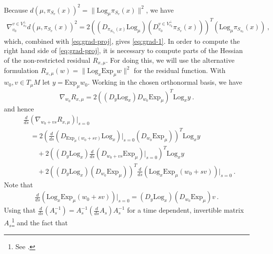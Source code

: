 \documentclass[final]{svjour3}
\newcommand{\df}[2]{\tfrac{d}{d#2} #1}
\newcommand{\Exp}{\mathrm{Exp}}
\newcommand{\Log}{\mathrm{Log}}
\begin{document}
Because $d(\mu,\pi_{S_v}(x))^2=\|\Log_\mu\pi_{S_v}(x)\|^2$, 
we have
\begin{equation}
    \begin{split}
        \nabla_{v_0}^{v\in V_{v_0}^\perp}d(\mu,\pi_{S_v}(x))^2
        =
        2\left((D_{\pi_{S_{v_0}}(x)}\Log_\mu)(D_{v_0}^{v\in
        V_{v_0}^\perp}\pi_{S_v}(x))\right)^T
        (\Log_\mu\pi_{S_{v_0}}(x))
        \ ,
    \end{split}
    \label{eq:full-expr}
\end{equation}
which, combined with \eqref{eq:grad-proj}, gives \eqref{eq:grad-1}.
In order to compute the right hand side of \eqref{eq:grad-proj}, it is necessary to
compute parts of the Hessian of the non-restricted residual $R_{x,\mu}$.
For doing this, we will use the alternative formulation 
$R_{x,\mu}(w)=\|\Log_x\Exp_\mu w\|^2$ for the residual function.
With $w_0,v\in T_\mu M$ let $y=\Exp_\mu w_0$.
Working in the chosen orthonormal basis, we have
\begin{equation*}
    \nabla_{w_0} R_{x,\mu}
    =2
    \left(\left(D_y\Log_x\right)D_{w_0}\Exp_\mu\right)^T
    \Log_xy
    \ .
\end{equation*}
and hence
\begin{equation}
    \begin{split}
        &\df{\left(\nabla_{w_0+vs} R_{x,\mu}\right)}{s}|_{s=0}
        \\
        &\quad
        =
        2\left(
        \df{\left(D_{\Exp_\mu (w_0+sv)}\Log_x\right)}{s}|_{s=0}
        \left(D_{w_0}\Exp_\mu\right)
        \right)^T
        \Log_xy
        \\
        &
        \qquad
        +
        2\left(
        \left(D_{y}\Log_x\right)
        \df{\left(D_{w_0+vs}\Exp_\mu\right)}{s}|_{s=0}
        \right)^T
        \Log_xy
        \\
        &
        \qquad
        +
        2\left(
        \left(D_{y}\Log_x\right)
        \left(D_{w_0}\Exp_\mu\right)
        \right)^T
        \df{\left(\Log_x\Exp_\mu (w_0+sv)\right)}{s}|_{s=0}
        \ .
    \end{split}
    \label{eq:hessian}
\end{equation}
Note that
\begin{align*}
    \df{\left(\Log_x\Exp_\mu (w_0+sv)\right)}{s}|_{s=0}
    =
    \left(D_y\Log_x\right)
    \left(D_{w_0}\Exp_\mu\right)
    v
    \ .
\end{align*}
Using that $\df{(A_s^{-1})}{s}=A_s^{-1}(\df{A_s}{s})A_s^{-1}$ for a time dependent,
invertible matrix $A_s$\footnote{
See \cite[Eq. (2)]{decell_derivative_1974}.
} and the fact that
\end{document}

